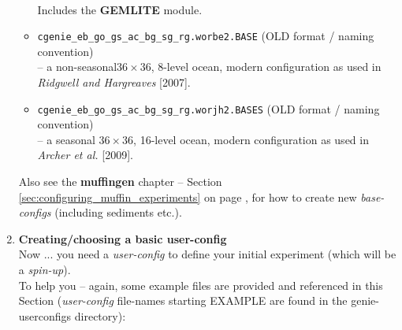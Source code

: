 \begin{enumerate}[noitemsep]
\begin{itemize}[noitemsep]
\\Includes the \textbf{GEMLITE} module.
\vspace{1mm}
\item \texttt{cgenie\_eb\_go\_gs\_ac\_bg\_sg\_rg.worbe2.BASE} (OLD format / naming convention)
\\ -- a  non-seasonal\(36\times36\), 8-level ocean, modern configuration as used in \textit{Ridgwell and Hargreaves} [2007].
\vspace{1mm}
\item \texttt{cgenie\_eb\_go\_gs\_ac\_bg\_sg\_rg.worjh2.BASES} (OLD format / naming convention)
\\-- a  seasonal \(36\times36\), 16-level ocean, modern configuration as used in \textit{Archer et al.} [2009].
\end{itemize}

\vspace{1mm}
Also see the \textbf{muffingen} chapter --  Section \ref{sec:configuring_muffin_experiments} on page \pageref{sec:configuring_muffin_experiments}, for how to create new \textit{base-configs} (including sediments etc.).


\newpage
%
\vspace{2mm}
\item \textbf{Creating/choosing a basic user-config}
\vspace{1mm}
\\Now ... you need a \textit{user-config} to define your initial experiment (which will be a \textit{spin-up}).
\vspace{1mm}
\\To help you -- again, some example files are provided and referenced in this Section (\textit{user-config} file-names starting \textsf{\footnotesize EXAMPLE} are found in the \textsf{\footnotesize genie-userconfigs} directory):


\end{enumerate}
